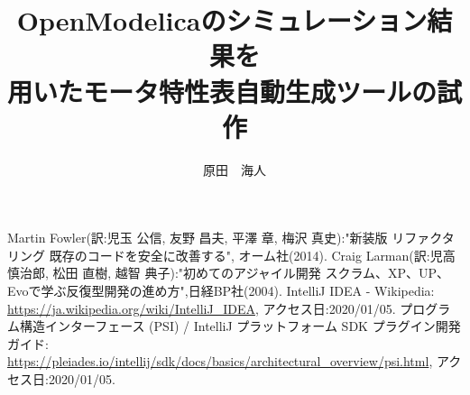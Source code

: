\documentclass[uplatex, report, a4j, 10pt]{jsbook}
\title{OpenModelicaのシミュレーション結果を\\用いたモータ特性表自動生成ツールの試作}
\author{原田　海人}
\begin{document}
\maketitle


%
% 








%
\acknowledgment


%
\begin{thebibliography}{0}
	Martin Fowler(訳:児玉 公信, 友野 昌夫, 平澤 章, 梅沢 真史):"新装版 リファクタリング 既存のコードを安全に改善する", オーム社(2014).
	Craig Larman(訳:児高 慎治郎, 松田 直樹, 越智 典子):"初めてのアジャイル開発 スクラム、XP、UP、Evoで学ぶ反復型開発の進め方",日経BP社(2004).
	IntelliJ IDEA - Wikipedia: \url{https://ja.wikipedia.org/wiki/IntelliJ_IDEA}, アクセス日:2020/01/05.
	プログラム構造インターフェース (PSI) / IntelliJ プラットフォーム SDK プラグイン開発ガイド: \url{https://pleiades.io/intellij/sdk/docs/basics/architectural_overview/psi.html}, アクセス日:2020/01/05.
\end{thebibliography}

\end{document}
